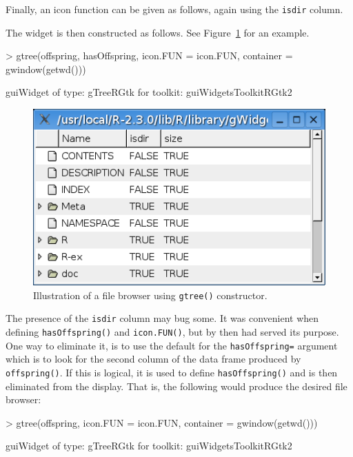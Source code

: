 \documentclass[12pt]{article}
\newcommand{\RCode}[1]{\texttt{#1}}
\newcommand{\RFunc}[1]{\texttt{#1()}}
\newcommand{\RArg}[1]{\texttt{#1=}}
\begin{document}
Finally, an icon function can be given as follows, again using the
\RCode{isdir} column.

\begin{Schunk}
\end{Schunk}

The widget is then constructed as follows. See
Figure~\ref{fig:filebrowser} for an example.
\begin{Schunk}
\begin{Sinput}
> gtree(offspring, hasOffspring, icon.FUN = icon.FUN, container = gwindow(getwd()))
\end{Sinput}
\begin{Soutput}
guiWidget of type: gTreeRGtk for toolkit: guiWidgetsToolkitRGtk2 
\end{Soutput}
\end{Schunk}

\begin{figure}[htbp]
  \centering
  \includegraphics[width=.6\textwidth]{filebrowser}
  \caption{Illustration of a file browser using \RFunc{gtree} constructor.}
  \label{fig:filebrowser}
\end{figure}

The presence of the \RCode{isdir} column may bug some. It was
convenient when defining \RFunc{hasOffspring} and \RFunc{icon.FUN},
but by then had served its purpose. One way to eliminate it, is to use
the default for the \RArg{hasOffspring} argument which is to look for
the second column of the data frame produced by \RFunc{offspring}. If
this is logical, it is used to define \RFunc{hasOffspring} and is then
eliminated from the display. That is, the following would produce the
desired file browser:

\begin{Schunk}
\begin{Sinput}
> gtree(offspring, icon.FUN = icon.FUN, container = gwindow(getwd()))
\end{Sinput}
\begin{Soutput}
guiWidget of type: gTreeRGtk for toolkit: guiWidgetsToolkitRGtk2 
\end{Soutput}
\end{Schunk}
\end{document}
